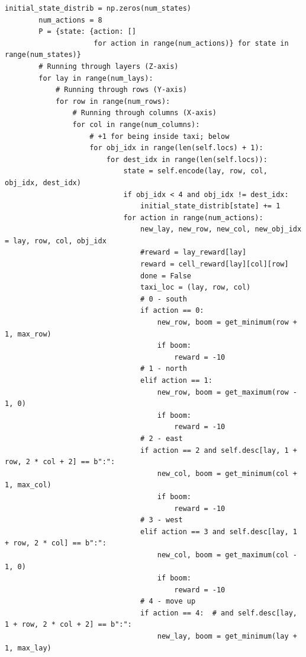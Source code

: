 \documentclass[a4paper]{report}
\theoremstyle{definition}
\theoremstyle{plain}
\theoremstyle{remark}
\theoremstyle{remark}
\theoremstyle{definition}
\begin{document}
\begin{lstlisting}[label=some-code, caption=labyrinth.py]
        initial_state_distrib = np.zeros(num_states)
        num_actions = 8
        P = {state: {action: []
                     for action in range(num_actions)} for state in range(num_states)}
        # Running through layers (Z-axis)
        for lay in range(num_lays):
            # Running through rows (Y-axis)
            for row in range(num_rows):
                # Running through columns (X-axis)
                for col in range(num_columns):
                    # +1 for being inside taxi; below
                    for obj_idx in range(len(self.locs) + 1): 
                        for dest_idx in range(len(self.locs)):
                            state = self.encode(lay, row, col, obj_idx, dest_idx)
                            if obj_idx < 4 and obj_idx != dest_idx:
                                initial_state_distrib[state] += 1
                            for action in range(num_actions):
                                new_lay, new_row, new_col, new_obj_idx = lay, row, col, obj_idx
                                #reward = lay_reward[lay]
                                reward = cell_reward[lay][col][row]
                                done = False
                                taxi_loc = (lay, row, col)
                                # 0 - south
                                if action == 0:
                                    new_row, boom = get_minimum(row + 1, max_row)
                                    if boom:
                                        reward = -10
                                # 1 - north
                                elif action == 1:
                                    new_row, boom = get_maximum(row - 1, 0)
                                    if boom:
                                        reward = -10
                                # 2 - east
                                if action == 2 and self.desc[lay, 1 + row, 2 * col + 2] == b":":
                                    new_col, boom = get_minimum(col + 1, max_col)
                                    if boom:
                                        reward = -10
                                # 3 - west
                                elif action == 3 and self.desc[lay, 1 + row, 2 * col] == b":":
                                    new_col, boom = get_maximum(col - 1, 0)
                                    if boom:
                                        reward = -10
                                # 4 - move up
                                if action == 4:  # and self.desc[lay, 1 + row, 2 * col + 2] == b":":
                                    new_lay, boom = get_minimum(lay + 1, max_lay)

\end{lstlisting}
\end{document}
